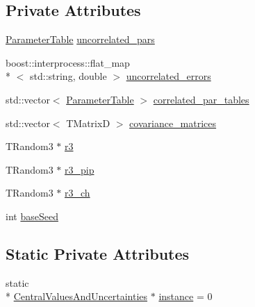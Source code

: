 \subsection*{Private Attributes}
\begin{DoxyCompactItemize}
\item 
\hyperlink{class_neutrino_flux_reweight_1_1_parameter_table}{Parameter\-Table} \hyperlink{class_neutrino_flux_reweight_1_1_central_values_and_uncertainties_a63acf76ede3ceff854b857a85612144b}{uncorrelated\-\_\-pars}
\item 
boost\-::interprocess\-::flat\-\_\-map\\*
$<$ std\-::string, double $>$ \hyperlink{class_neutrino_flux_reweight_1_1_central_values_and_uncertainties_a0c8b32122be01f7f29117a17f5c43ad7}{uncorrelated\-\_\-errors}
\item 
std\-::vector$<$ \hyperlink{class_neutrino_flux_reweight_1_1_parameter_table}{Parameter\-Table} $>$ \hyperlink{class_neutrino_flux_reweight_1_1_central_values_and_uncertainties_a6bfc15e23731abe341522e207637690a}{correlated\-\_\-par\-\_\-tables}
\item 
std\-::vector$<$ T\-Matrix\-D $>$ \hyperlink{class_neutrino_flux_reweight_1_1_central_values_and_uncertainties_a7dbe89396ded22dc694de13bc1fad309}{covariance\-\_\-matrices}
\item 
T\-Random3 $\ast$ \hyperlink{class_neutrino_flux_reweight_1_1_central_values_and_uncertainties_a0eca6932a5ff05df3a216e8c36cbba6e}{r3}
\item 
T\-Random3 $\ast$ \hyperlink{class_neutrino_flux_reweight_1_1_central_values_and_uncertainties_a040a7398532acbccd50713e1736012bd}{r3\-\_\-pip}
\item 
T\-Random3 $\ast$ \hyperlink{class_neutrino_flux_reweight_1_1_central_values_and_uncertainties_ae8b142852330974ed1ac503667962cc2}{r3\-\_\-ch}
\item 
int \hyperlink{class_neutrino_flux_reweight_1_1_central_values_and_uncertainties_ab3d8d57b6b429f0db813d4f51fa05006}{base\-Seed}
\end{DoxyCompactItemize}
\subsection*{Static Private Attributes}
\begin{DoxyCompactItemize}
\item 
static \\*
\hyperlink{class_neutrino_flux_reweight_1_1_central_values_and_uncertainties}{Central\-Values\-And\-Uncertainties} $\ast$ \hyperlink{class_neutrino_flux_reweight_1_1_central_values_and_uncertainties_a13ed94a2277d61d41898faa34e241017}{instance} = 0
\end{DoxyCompactItemize}


